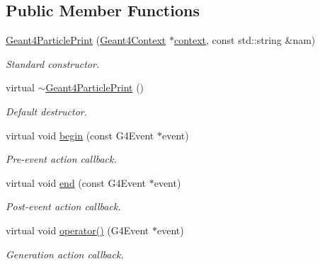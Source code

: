 \subsection*{Public Member Functions}
\begin{DoxyCompactItemize}
\item 
\hyperlink{class_d_d4hep_1_1_simulation_1_1_geant4_particle_print_a58c9b621de94baca62700ae958afc596}{Geant4\+Particle\+Print} (\hyperlink{class_d_d4hep_1_1_simulation_1_1_geant4_context}{Geant4\+Context} $\ast$\hyperlink{class_d_d4hep_1_1_simulation_1_1_geant4_action_aa9d87f0ec2a72b7fc2591b18f98d75cf}{context}, const std\+::string \&nam)
\begin{DoxyCompactList}\small\item\em Standard constructor. \end{DoxyCompactList}\item 
virtual \hyperlink{class_d_d4hep_1_1_simulation_1_1_geant4_particle_print_a6a9afd3df558e060f8bb32db26de8433}{$\sim$\+Geant4\+Particle\+Print} ()
\begin{DoxyCompactList}\small\item\em Default destructor. \end{DoxyCompactList}\item 
virtual void \hyperlink{class_d_d4hep_1_1_simulation_1_1_geant4_particle_print_ad1a3cbd1ef6837aa2bccb3b01c415d8f}{begin} (const G4\+Event $\ast$event)
\begin{DoxyCompactList}\small\item\em Pre-\/event action callback. \end{DoxyCompactList}\item 
virtual void \hyperlink{class_d_d4hep_1_1_simulation_1_1_geant4_particle_print_ad2ba85711f58068667eb94d1f6b80012}{end} (const G4\+Event $\ast$event)
\begin{DoxyCompactList}\small\item\em Post-\/event action callback. \end{DoxyCompactList}\item 
virtual void \hyperlink{class_d_d4hep_1_1_simulation_1_1_geant4_particle_print_a6aa380c89db0f6359ba163e196b50938}{operator()} (G4\+Event $\ast$event)
\begin{DoxyCompactList}\small\item\em Generation action callback. \end{DoxyCompactList}\end{DoxyCompactItemize}
